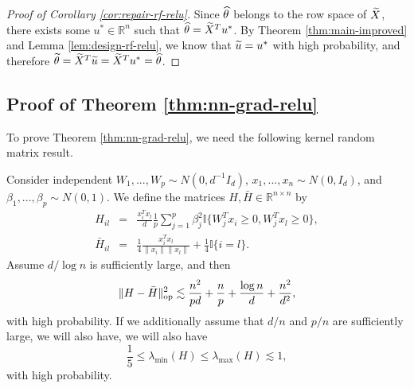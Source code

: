 \begin{proof}[Proof of Corollary \ref{cor:repair-rf-relu}]
Since $\widehat{\theta}$ belongs to the row space of $\widetilde{X}$, there exists some $u^*\in\mathbb{R}^n$ such that $\widehat{\theta}=\widetilde{X}^Tu^*$.
By Theorem \ref{thm:main-improved} and Lemma \ref{lem:design-rf-relu}, we know that $\widetilde{u}=u^*$ with high probability, and therefore $\widetilde{\theta}=\widetilde{X}^T\widetilde{u}=\widetilde{X}^Tu^*=\widehat{\theta}$.
\end{proof}



\subsection{Proof of Theorem \ref{thm:nn-grad-relu}}

To prove Theorem \ref{thm:nn-grad-relu}, we need the following kernel random matrix result.
\begin{lemma}\label{lem:lim-H-relu}
Consider independent $W_1,...,W_p\sim N(0,d^{-1}I_d)$, $x_1,...,x_n\sim N(0,I_d)$, and $\beta_1,...,\beta_p\sim N(0,1)$. We define the matrices $H, \bar{H}\in\mathbb{R}^{n\times n}$ by
\begin{eqnarray*}
H_{il} &=& \frac{x_i^Tx_l}{d}\frac{1}{p}\sum_{j=1}^p\beta_j^2\mathbb{I}\{W_j^Tx_i\geq 0, W_j^Tx_l\geq 0\}, \\
\bar{H}_{il} &=& \frac{1}{4}\frac{x_i^Tx_l}{\|x_i\|\|x_l\|} + \frac{1}{4}\mathbb{I}\{i=l\}.
\end{eqnarray*}
Assume $d/\log n$ is sufficiently large, and then
$$\|H-\bar{H}\|_{\rm op}^2 \lesssim \frac{n^2}{pd} + \frac{n}{p} + \frac{\log n}{d} + \frac{n^2}{d^2},$$
with high probability. If we additionally assume that $d/n$ and $p/n$ are sufficiently large, we will also have, we will also have
$$\frac{1}{5}\leq\lambda_{\min}(H)\leq\lambda_{\max}(H)\lesssim 1,$$
with high probability.
\end{lemma}

